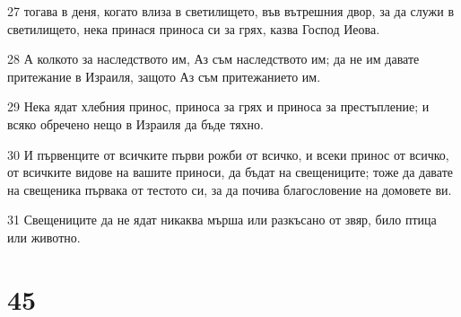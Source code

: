 \par 27 тогава в деня, когато влиза в светилището, във вътрешния двор, за да служи в светилището, нека принася приноса си за грях, казва Господ Иеова.
\par 28 А колкото за наследството им, Аз съм наследството им; да не им давате притежание в Израиля, защото Аз съм притежанието им.
\par 29 Нека ядат хлебния принос, приноса за грях и приноса за престъпление; и всяко обречено нещо в Израиля да бъде тяхно.
\par 30 И първенците от всичките първи рожби от всичко, и всеки принос от всичко, от всичките видове на вашите приноси, да бъдат на свещениците; тоже да давате на свещеника първака от тестото си, за да почива благословение на домовете ви.
\par 31 Свещениците да не ядат никаква мърша или разкъсано от звяр, било птица или животно.

\chapter{45}

